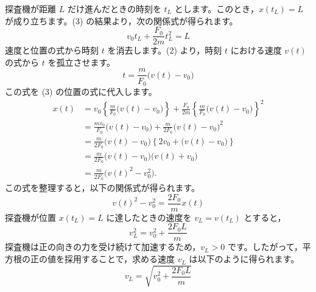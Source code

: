 \begin{solutionparts}
探査機が距離 $L$ だけ進んだときの時刻を $t_L$ とします。このとき，$x(t_L)=L$ が成り立ちます。(3) の結果より，次の関係式が得られます。
\begin{equation*}
  v_0t_L+\frac{F_0}{2m}t_L^2=L
\end{equation*}
速度と位置の式から時刻 $t$ を消去します。(2) より，時刻 $t$ における速度 $v(t)$ の式から $t$ を孤立させます。
\begin{equation*}
  t=\frac{m}{F_0}\bigl(v(t)-v_0\bigr)
\end{equation*}
この式を (3) の位置の式に代入します。
\begin{align*}
  x(t)
  &=v_0\left\{\frac{m}{F_0}\bigl(v(t)-v_0\bigr)\right\}
    +\frac{F_0}{2m}
    \left\{\frac{m}{F_0}\bigl(v(t)-v_0\bigr)\right\}^2 \\
  &=\frac{mv_0}{F_0}\bigl(v(t)-v_0\bigr)
    +\frac{m}{2F_0}\bigl(v(t)-v_0\bigr)^2 \\
  &=\frac{m}{2F_0}\bigl(v(t)-v_0\bigr)
    \left\{2v_0+\bigl(v(t)-v_0\bigr)\right\} \\
  &=\frac{m}{2F_0}\bigl(v(t)-v_0\bigr)\bigl(v(t)+v_0\bigr) \\
  &=\frac{m}{2F_0}\bigl(v(t)^2-v_0^2\bigr).
\end{align*}
この式を整理すると，以下の関係式が得られます。
\begin{equation*}
  v(t)^2-v_0^2=\frac{2F_0}{m}x(t)
\end{equation*}
探査機が位置 $x(t_L)=L$ に達したときの速度を $v_L=v(t_L)$ とすると，
\begin{equation*}
  v_L^2=v_0^2+\frac{2F_0L}{m}
\end{equation*}
探査機は正の向きの力を受け続けて加速するため，$v_L>0$ です。したがって，平方根の正の値を採用することで，求める速度 $v_L$ は以下のように得られます。
\begin{equation*}
  \boxed{v_L=\sqrt{v_0^2+\frac{2F_0L}{m}}}
\end{equation*}

\end{solutionparts}
